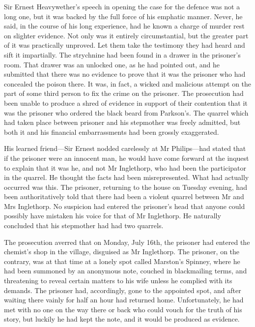  Sir Ernest Heavywether's speech in opening the case for the defence was not a long one, but it was backed by the full force of his emphatic manner. Never, he said, in the course of his long experience, had he known a charge of murder rest on slighter evidence. Not only was it entirely circumstantial, but the greater part of it was practically unproved. Let them take the testimony they had heard and sift it impartially. The strychnine had been found in a drawer in the prisoner's room. That drawer was an unlocked one, as he had pointed out, and he submitted that there was no evidence to prove that it was the prisoner who had concealed the poison there. It was, in fact, a wicked and malicious attempt on the part of some third person to fix the crime on the prisoner. The prosecution had been unable to produce a shred of evidence in support of their contention that it was the prisoner who ordered the black beard from Parkson's. The quarrel which had taken place between prisoner and his stepmother was freely admitted, but both it and his financial embarrassments had been grossly exaggerated. 

 His learned friend—Sir Ernest nodded carelessly at Mr Philips—had stated that if the prisoner were an innocent man, he would have come forward at the inquest to explain that it was he, and not Mr Inglethorp, who had been the participator in the quarrel. He thought the facts had been misrepresented. What had actually occurred was this. The prisoner, returning to the house on Tuesday evening, had been authoritatively told that there had been a violent quarrel between Mr and Mrs Inglethorp. No suspicion had entered the prisoner's head that anyone could possibly have mistaken his voice for that of Mr Inglethorp. He naturally concluded that his stepmother had had two quarrels. 

 The prosecution averred that on Monday, July 16th, the prisoner had entered the chemist's shop in the village, disguised as Mr Inglethorp. The prisoner, on the contrary, was at that time at a lonely spot called Marston's Spinney, where he had been summoned by an anonymous note, couched in blackmailing terms, and threatening to reveal certain matters to his wife unless he complied with its demands. The prisoner had, accordingly, gone to the appointed spot, and after waiting there vainly for half an hour had returned home. Unfortunately, he had met with no one on the way there or back who could vouch for the truth of his story, but luckily he had kept the note, and it would be produced as evidence. 

